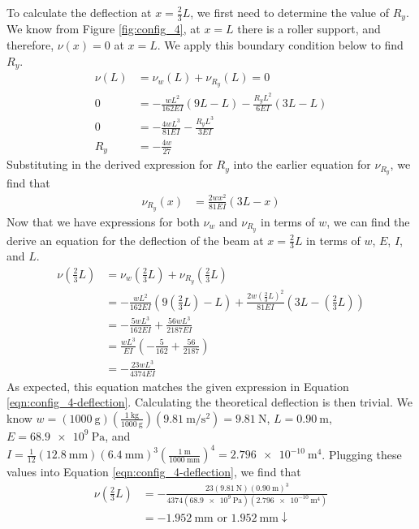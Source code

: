 \documentclass[12 pt]{article}
\begin{document}
To calculate the deflection at $x=\frac{2}{3}L$, we first need to determine the value of $R_y$. We know from Figure \ref{fig:config_4}, at $x=L$ there is a roller support, and therefore, $\nu(x)=0$ at $x=L$. We apply this boundary condition below to find $R_y$.
\begin{align*}
	\nu(L)&=\nu_w(L)+\nu_{R_y}(L)=0\\
	0&=-\frac{wL^2}{162EI}(9L-L)-\frac{R_yL^2}{6EI}(3L-L)\\
	0&=-\frac{4wL^3}{81EI}-\frac{R_yL^3}{3EI}\\
	R_y&=-\frac{4w}{27}
\end{align*}
Substituting in the derived expression for $R_y$ into the earlier equation for $\nu_{R_y}$, we find that
\begin{align*}
	\nu_{R_y}(x)&=\frac{2wx^2}{81EI}(3L-x)
\end{align*}
Now that we have expressions for both $\nu_w$ and $\nu_{R_y}$ in terms of $w$, we can find the derive an equation for the deflection of the beam at $x=\frac{2}{3}L$ in terms of $w$, $E$, $I$, and $L$.
\begin{align*}
	\nu\left(\frac{2}{3}L\right)&=\nu_w\left(\frac{2}{3}L\right)+\nu_{R_y}\left(\frac{2}{3}L\right)\\
	&=-\frac{wL^2}{162EI}\left(9\left(\frac{2}{3}L\right)-L\right)+\frac{2w\left(\frac{2}{3}L\right)^2}{81EI}\left(3L-\left(\frac{2}{3}L\right)\right)\\
	&=-\frac{5wL^3}{162EI}+\frac{56wL^3}{2187EI}\\
	&=\frac{wL^3}{EI}\left(-\frac{5}{162}+\frac{56}{2187}\right)\\
	&=-\frac{23wL^3}{4374EI}
\end{align*}
As expected, this equation matches the given expression in Equation \ref{eqn:config_4-deflection}. Calculating the theoretical deflection is then trivial. We know $w=(\qty{1000}{\g})(\frac{\qty{1}{\kg}}{\qty{1000}{\g}})(\qty[per-mode=fraction]{9.81}{\m\per\s\squared})=\qty{9.81}{\N}$, $L=\qty{0.90}{\m}$, $E=\qty{68.9e9}{\Pa}$, and $I=\frac{1}{12}(\qty{12.8}{\mm})(\qty{6.4}{\mm})^3(\frac{\qty{1}{\m}}{\qty{1000}{\mm}})^4=\qty{2.796e-10}{\m^4}$. Plugging these values into Equation \ref{eqn:config_4-deflection}, we find that
\begin{align*}
	\nu\left(\frac{2}{3}L\right)&=-\frac{23(\qty{9.81}{\N})(\qty{0.90}{\m})^3}{4374(\qty{68.9e9}{\Pa})(\qty{2.796e-10}{\m^4})}\\
	&=\qty{-1.952}{\mm}\text{ or }\qty{1.952}{\mm}\downarrow
\end{align*}
\end{document}
